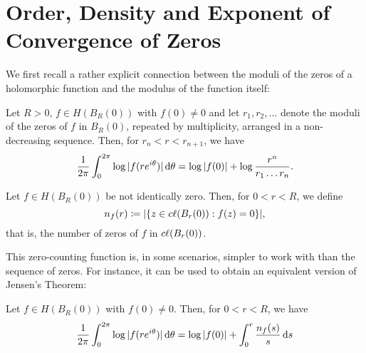 \section{Order, Density and Exponent of Convergence of Zeros} \label{sec:zeros}


We first recall a rather explicit connection between the moduli of the zeros of a holomorphic function and the modulus of the function itself:

\begin{theorem}[Jensen] \label{thm:jensen}
    Let $R > 0$, $f \in H(B_R(0))$ with $f(0) \neq 0$ and let $r_1, r_2, \hdots$ denote the moduli of the zeros of $f$ in $B_{R}(0)$, repeated by multiplicity, arranged in a non-decreasing sequence. Then, for $r_n < r < r_{n+1}$, we have
    \begin{equation}
        \frac{1}{2 \pi} \int_0^{2\pi} \log \vert f(r e^{i \theta}) \vert \mathop{}\!\mathrm{d} \theta = \log \vert f(0) \vert + \log \frac{r^n}{r_1 \hdots r_n}.
    \end{equation}
\end{theorem}

\begin{definition}
    Let $f \in H(B_R(0))$ be not identically zero. Then, for $0 < r < R$, we define
    \begin{equation}
        n_f(r) \coloneqq \vert \{ z \in c\ell({B_r(0)}) : f(z) = 0 \} \vert,
    \end{equation}
    that is, the number of zeros of $f$ in $c\ell({B_{r}(0)})$.
\end{definition}

This zero-counting function is, in some scenarios, simpler to work with than the sequence of zeros. For instance, it can be used to obtain an equivalent version of Jensen's Theorem:

\begin{corollary} \label{cor:jensen-nf}
    Let $f \in H(B_R(0))$ with $f(0) \neq 0$. Then, for $0 < r < R$, we have
    \begin{equation}
        \frac{1}{2 \pi} \int_0^{2\pi} \log \vert f(re^{i \theta}) \vert \mathop{}\!\mathrm{d} \theta = \log \vert f(0) \vert + \int_0^r \frac{n_f(s)}{s} \mathop{}\!\mathrm{d} s
    \end{equation}
\end{corollary}

